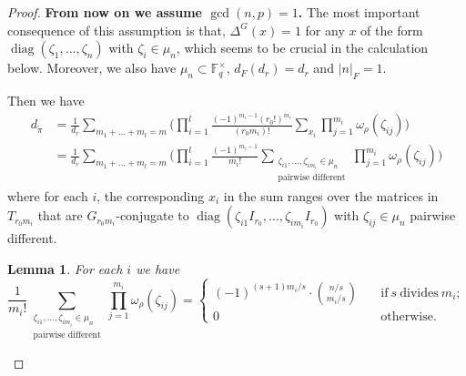 \documentclass{amsart}
\numberwithin{equation}{section}
\newtheorem{lemma}[theorem]{\bf{Lemma}}
\newcommand{\abs}[1]{\left|#1\right|_{F}}
\newcommand{\mrdiag}{\operatorname{diag}}
\newcommand{\mrgcd}{\operatorname{gcd}}
\newcommand{\mbf}{\mathbb{F}}
\newcommand{\dF}[1]{d_{F}(#1)}
\newcommand{\wt}[1]{\widetilde{#1}}
\begin{document}
\begin{proof}
			\textbf{From now on we assume $\mrgcd(n,p)=1$.} The most important consequence of this assumption is that, $\Delta^{G}(x)=1$ for any $x$ of the form $\mrdiag(\zeta_{1},\dots,\zeta_{n})$ with $\zeta_{i}\in\mu_{n}$, which seems to be crucial in the calculation below. Moreover, we also have $\mu_{n}\subset\mbf_{q}^{\times}$, $\dF{d_{r}}=d_{r}$ and $\abs{n}=1$.
			
			Then we have
			\begin{align*}
				d_{\wt{\pi}}&=\frac{1}{d_{r}}\sum_{m_{1}+\dots+m_{l}=m}\bigg(\prod_{i=1}^{l}\frac{(-1)^{m_{i}-1}(r_{0}!)^{m_{i}}}{(r_{0}m_{i})!}\sum_{x_{i}}\prod_{j=1}^{m_{i}}\omega_{\rho}(\zeta_{ij})\bigg)\\
				&=\frac{1}{d_{r}}\sum_{m_{1}+\dots+m_{l}=m}\bigg(\prod_{i=1}^{l}\frac{(-1)^{m_{i}-1}}{m_{i}!}\sum_{\substack{\zeta_{i1},\dots,\zeta_{im_{i}}\in\mu_{n}\\ \text{pairwise different}} }\prod_{j=1}^{m_{i}}\omega_{\rho}(\zeta_{ij})\bigg)
			\end{align*}
			where for each $i$, the corresponding $x_{i}$ in the sum ranges over the matrices in $T_{r_{0}m_{i}}$ that are $G_{r_{0}m_{i}}$-conjugate to $\mrdiag(\zeta_{i1}I_{r_{0}},\dots,\zeta_{im_{i}}I_{r_{0}})$ with $\zeta_{ij}\in\mu_{n}$ pairwise different. 
			
			\begin{lemma}
				For each $i$ we have
				$$\frac{1}{m_{i}!}\sum_{\substack{\zeta_{i1},\dots,\zeta_{im_{i}}\in\mu_{n}\\ \text{pairwise different}} }\prod_{j=1}^{m_{i}}\omega_{\rho}(\zeta_{ij})=\begin{cases}
					(-1)^{(s+1)m_{i}/s}\cdot\binom{n/s}{m_{i}/s}\quad&\text{if}\ s\ \text{divides}\ m_{i};\\
					0\quad&\text{otherwise}.
				\end{cases}$$
			\end{lemma}
			

\end{proof}
\end{document}
